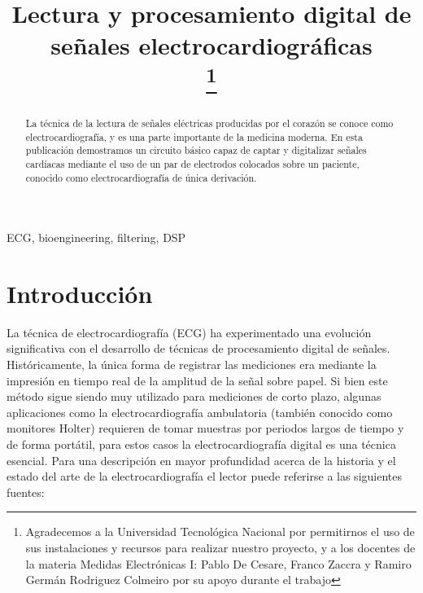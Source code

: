 \documentclass[conference]{IEEEtran}
\begin{document}
 
 
\title{Lectura y procesamiento digital de señales electrocardiográficas\\
\thanks{Agradecemos a la Universidad Tecnológica Nacional por permitirnos
el uso de sus instalaciones y recursos para realizar nuestro proyecto, y a los
docentes de la materia Medidas Electrónicas I: Pablo De Cesare, Franco Zaccra
y Ramiro Germán Rodriguez Colmeiro por su apoyo durante el trabajo}
}

\author{
\and
{}
}

\maketitle

\begin{abstract}
La técnica de la lectura de señales eléctricas producidas por el corazón se
conoce como electrocardiografía, y es una parte importante de la medicina
moderna. En esta publicación demostramos un circuito básico capaz de captar y
digitalizar señales cardíacas mediante el uso de un par de electrodos colocados
sobre un paciente, conocido como electrocardiografía de única derivación. 
\end{abstract}

\begin{IEEEkeywords}
ECG, bioengineering, filtering, DSP
\end{IEEEkeywords}

\section{Introducción}
 
La técnica de electrocardiografía (ECG) ha experimentado una evolución
significativa con el desarrollo de técnicas de procesamiento digital de señales.
Históricamente, la única forma de registrar las mediciones era mediante la
impresión en tiempo real de la amplitud de la señal sobre papel. Si bien este
método sigue siendo muy utilizado para mediciones de corto plazo, algunas
aplicaciones como la electrocardiografía ambulatoria (también conocido como
monitores Holter) requieren de tomar muestras por periodos largos de tiempo y de
forma portátil, para estos casos la electrocardiografía digital es una técnica
esencial. Para una descripción en mayor profundidad acerca de la historia y el
estado del arte de la electrocardiografía el lector puede referirse a las
siguientes fuentes: \cite{ecg_history} \cite{ecg_moderno}
  
\end{document}
